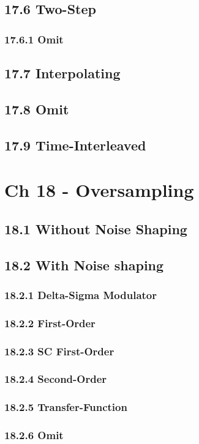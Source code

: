 \documentclass[a4paper,twocolumn]{article}
\begin{document}
    \subsection{17.6 Two-Step}
      \subsubsection{17.6.1 Omit}
    \subsection{17.7 Interpolating}
    \subsection{17.8 Omit}
    \subsection{17.9 Time-Interleaved}
  \section{Ch 18 - Oversampling}
    \subsection{18.1 Without Noise Shaping}
    \subsection{18.2 With Noise shaping}
      \subsubsection{18.2.1 Delta-Sigma Modulator}
      \subsubsection{18.2.2 First-Order}
      \subsubsection{18.2.3 SC First-Order}
      \subsubsection{18.2.4 Second-Order}
      \subsubsection{18.2.5 Transfer-Function}
      \subsubsection{18.2.6 Omit}
\end{document}
